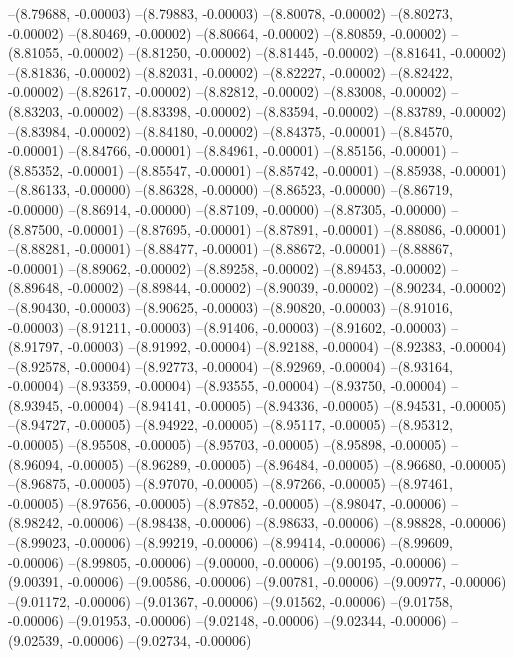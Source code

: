 --(8.79688, -0.00003)
--(8.79883, -0.00003)
--(8.80078, -0.00002)
--(8.80273, -0.00002)
--(8.80469, -0.00002)
--(8.80664, -0.00002)
--(8.80859, -0.00002)
--(8.81055, -0.00002)
--(8.81250, -0.00002)
--(8.81445, -0.00002)
--(8.81641, -0.00002)
--(8.81836, -0.00002)
--(8.82031, -0.00002)
--(8.82227, -0.00002)
--(8.82422, -0.00002)
--(8.82617, -0.00002)
--(8.82812, -0.00002)
--(8.83008, -0.00002)
--(8.83203, -0.00002)
--(8.83398, -0.00002)
--(8.83594, -0.00002)
--(8.83789, -0.00002)
--(8.83984, -0.00002)
--(8.84180, -0.00002)
--(8.84375, -0.00001)
--(8.84570, -0.00001)
--(8.84766, -0.00001)
--(8.84961, -0.00001)
--(8.85156, -0.00001)
--(8.85352, -0.00001)
--(8.85547, -0.00001)
--(8.85742, -0.00001)
--(8.85938, -0.00001)
--(8.86133, -0.00000)
--(8.86328, -0.00000)
--(8.86523, -0.00000)
--(8.86719, -0.00000)
--(8.86914, -0.00000)
--(8.87109, -0.00000)
--(8.87305, -0.00000)
--(8.87500, -0.00001)
--(8.87695, -0.00001)
--(8.87891, -0.00001)
--(8.88086, -0.00001)
--(8.88281, -0.00001)
--(8.88477, -0.00001)
--(8.88672, -0.00001)
--(8.88867, -0.00001)
--(8.89062, -0.00002)
--(8.89258, -0.00002)
--(8.89453, -0.00002)
--(8.89648, -0.00002)
--(8.89844, -0.00002)
--(8.90039, -0.00002)
--(8.90234, -0.00002)
--(8.90430, -0.00003)
--(8.90625, -0.00003)
--(8.90820, -0.00003)
--(8.91016, -0.00003)
--(8.91211, -0.00003)
--(8.91406, -0.00003)
--(8.91602, -0.00003)
--(8.91797, -0.00003)
--(8.91992, -0.00004)
--(8.92188, -0.00004)
--(8.92383, -0.00004)
--(8.92578, -0.00004)
--(8.92773, -0.00004)
--(8.92969, -0.00004)
--(8.93164, -0.00004)
--(8.93359, -0.00004)
--(8.93555, -0.00004)
--(8.93750, -0.00004)
--(8.93945, -0.00004)
--(8.94141, -0.00005)
--(8.94336, -0.00005)
--(8.94531, -0.00005)
--(8.94727, -0.00005)
--(8.94922, -0.00005)
--(8.95117, -0.00005)
--(8.95312, -0.00005)
--(8.95508, -0.00005)
--(8.95703, -0.00005)
--(8.95898, -0.00005)
--(8.96094, -0.00005)
--(8.96289, -0.00005)
--(8.96484, -0.00005)
--(8.96680, -0.00005)
--(8.96875, -0.00005)
--(8.97070, -0.00005)
--(8.97266, -0.00005)
--(8.97461, -0.00005)
--(8.97656, -0.00005)
--(8.97852, -0.00005)
--(8.98047, -0.00006)
--(8.98242, -0.00006)
--(8.98438, -0.00006)
--(8.98633, -0.00006)
--(8.98828, -0.00006)
--(8.99023, -0.00006)
--(8.99219, -0.00006)
--(8.99414, -0.00006)
--(8.99609, -0.00006)
--(8.99805, -0.00006)
--(9.00000, -0.00006)
--(9.00195, -0.00006)
--(9.00391, -0.00006)
--(9.00586, -0.00006)
--(9.00781, -0.00006)
--(9.00977, -0.00006)
--(9.01172, -0.00006)
--(9.01367, -0.00006)
--(9.01562, -0.00006)
--(9.01758, -0.00006)
--(9.01953, -0.00006)
--(9.02148, -0.00006)
--(9.02344, -0.00006)
--(9.02539, -0.00006)
--(9.02734, -0.00006)
